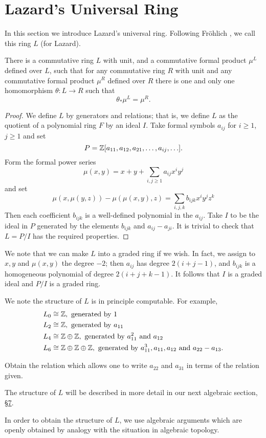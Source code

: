 \documentclass[../main]{subfiles}
\begin{document}
\label{sec:p2c5}

\chapter{Lazard's Universal Ring}

In this section we introduce Lazard's universal ring. Following Fr\"{o}hlich \cite{frolich}, we call this ring $L$ (for Lazard).

\begin{theorem}
\label{thm:p2c05.1}
There is a commutative ring $L$ with unit, and a commutative formal product $\mu^L$ defined over $L$, such that for any commutative ring $R$ with unit and any commutative formal product $\mu^R$ defined over $R$ there is one and only one homomorphism $\theta:L\longrightarrow R$ such that \[\theta_\ast\mu^L = \mu^R.\]
\end{theorem}
\begin{proof}
We define $L$ by generators and relations; that is, we define $L$ as the quotient of a polynomial ring $F$ by an ideal $I$. Take formal symbols $a_{ij}$ for $i\ge 1$, $j\ge 1$ and set \[P = \mathbb{Z} [a_{11}, a_{12}, a_{21}, \ldots, a_{ij}, \ldots].\]
Form the formal power series \begin{equation}
\label{eqn:p2c05.2}
\tag{5.2}
\mu(x,y) = x+y+\sum_{i,j\ge 1} a_{ij} x^i y^j
\end{equation}
and set 
\begin{equation}
\label{eqn:p2c05.3}
\tag{5.3}
\mu(x, \mu(y,z)) - \mu(\mu(x,y),z) = \sum_{i,j,k} b_{ijk} x^i y^j z^k
\end{equation}
Then each coefficient $b_{ijk}$ is a well-defined polynomial in the $a_{ij}$. Take $I$ to be the ideal in $P$ generated by the elements $b_{ijk}$ and $a_{ij} - a_{ji}$. It is trivial to check that $L=P/I$ has the required properties. 
\end{proof}
We note that we can make $L$ into a graded ring if we wish. In fact, we assign to $x,y$ and $\mu(x,y)$ the degree $-2$; then $a_{ij}$ has degree $2(i+j-1)$, and $b_{ijk}$ is a homogeneous polynomial of degree $2(i+j+k-1)$. It follows that $I$ is a graded ideal and $P/I$ is a graded ring.

We note the structure of $L$ is in principle computable. For example, 
\begin{align*}
L_0 &\cong \mathbb{Z},\text{ generated by }1\\
L_2 &\cong \mathbb{Z},\text{ generated by }a_{11}\\
L_4 &\cong \mathbb{Z}\oplus\mathbb{Z},\text{ generated by }a^2_{11}\text{ and }a_{12}\\
L_6 &\cong \mathbb{Z}\oplus\mathbb{Z}\oplus\mathbb{Z},\text{ generated by }a^3_{11}, a_{11}, a_{12}\text{ and }a_{22}-a_{13}.
\end{align*}
\begin{exercise}
Obtain the relation which allows one to write $a_{22}$ and $a_{31}$ in terms of the relation given.
\end{exercise}
The structure of $L$ will be described in more detail in our next algebraic section, \hyperref[sec:p2c7]{\S 7}. 

In order to obtain the structure of $L$, we use algebraic arguments which are openly obtained by analogy with the situation in algebraic topology. 
\end{document}
